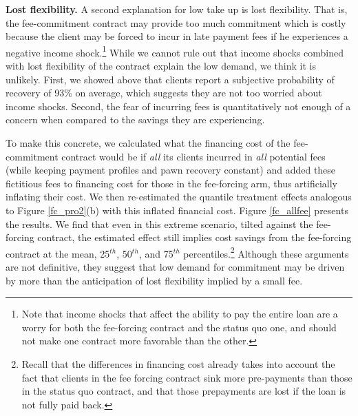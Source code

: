 \documentclass[oneside,11pt]{article}
\begin{document}
\vspace{.1in}
\noindent \textbf{Lost flexibility.} A second explanation for low take up is lost flexibility. That is, the fee-commitment contract may provide too much commitment which is costly because the client may be forced to incur in late payment fees if he experiences a negative income shock.\footnote{Note that income shocks that affect the ability to pay the entire loan are a worry for both the fee-forcing contract and the status quo one, and should not make one contract more favorable than the other.} While we cannot rule out that income shocks combined with lost flexibility of the contract explain the low demand, we think it is unlikely. First, we showed above that clients report a subjective probability of recovery of 93\% on average, which suggests they are not too worried about income shocks. Second, the fear of incurring fees is quantitatively not enough of a concern when compared to the savings they are experiencing. %

To make this concrete, we calculated what the financing cost of the fee-commitment contract would be if \textit{all} its clients incurred in \textit{all} potential fees (while keeping payment profiles and pawn recovery constant) and added these fictitious fees to financing cost for those in the fee-forcing arm, thus artificially inflating their cost. We then re-estimated the quantile treatment effects analogous to Figure \ref{fc_pro2}(b) with this inflated financial cost. %
Figure \ref{fc_allfee} presents the results. We find that even in this extreme scenario, tilted against the fee-forcing contract, the estimated effect still implies cost savings from the fee-forcing contract at the mean, 25$^{th}$, 50$^{th}$, and 75$^{th}$ percentiles.\footnote{Recall that the differences in financing cost already takes into account the fact that clients in the fee forcing contract sink more pre-payments than those in the status quo contract, and that those prepayments are lost if the loan is not fully paid back.}  Although these arguments are not definitive, they suggest that low demand for commitment may be driven by more than the anticipation of lost flexibility implied by a small fee.
\end{document}
